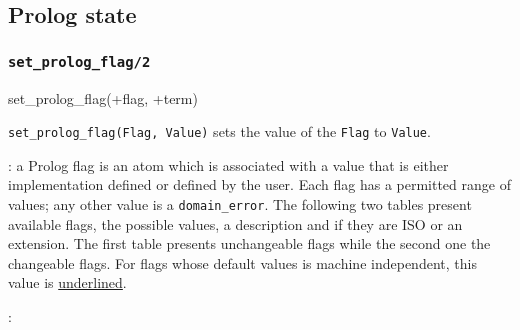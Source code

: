 \subsection{Prolog state} 

\subsubsection{\texttt{set\_prolog\_flag/2}}
\label{set-prolog-flag/2}

\begin{TemplatesOneCol}
set\_prolog\_flag(+flag, +term)

\end{TemplatesOneCol}

\Description

\texttt{set\_prolog\_flag(Flag, Value)} sets the value
of the  \texttt{Flag} to \texttt{Value}.

: a Prolog flag is an atom
which is associated with a value that is either implementation defined
or defined by the user. Each flag has a permitted range of values; any
other value is a \texttt{domain\_error}. The following two tables
present available flags, the possible values, a description and if
they are ISO or an extension. The first table presents unchangeable
flags while the second one the changeable flags. For flags whose
default values is machine independent, this value is
\underline{underlined}.

:

